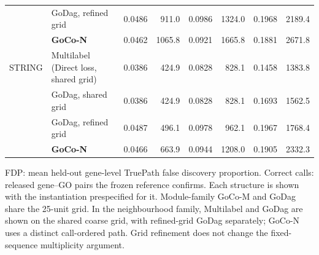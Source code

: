 \begin{table}[!t]
\begin{tabular}{ll rr rr rr}
 & GoDag, refined grid & 0.0486 & 911.0 & 0.0986 & 1324.0 & 0.1968 & 2189.4 \\
 & \textbf{GoCo-N} & 0.0462 & 1065.8 & 0.0921 & 1665.8 & 0.1881 & 2671.8 \\
\addlinespace[2pt]
STRING & Multilabel (Direct loss, shared grid) & 0.0386 & 424.9 & 0.0828 & 828.1 & 0.1458 & 1383.8 \\
 & GoDag, shared grid & 0.0386 & 424.9 & 0.0828 & 828.1 & 0.1693 & 1562.5 \\
 & GoDag, refined grid & 0.0487 & 496.1 & 0.0978 & 962.1 & 0.1967 & 1768.4 \\
 & \textbf{GoCo-N} & 0.0466 & 663.9 & 0.0944 & 1208.0 & 0.1905 & 2332.3 \\
\bottomrule
\end{tabular}
\par\vspace{3pt}\begin{minipage}{\linewidth}\footnotesize FDP: mean held-out gene-level TruePath false discovery proportion. Correct calls: released gene--GO pairs the frozen reference confirms. Each structure is shown with the instantiation prespecified for it. Module-family GoCo-M and GoDag share the 25-unit grid. In the neighbourhood family, Multilabel and GoDag are shown on the shared coarse grid, with refined-grid GoDag separately; GoCo-N uses a distinct call-ordered path. Grid refinement does not change the fixed-sequence multiplicity argument.\end{minipage}
\label{supp:last-page}
\end{table}
